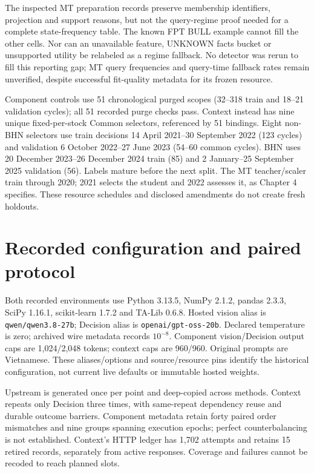 The inspected MT preparation records preserve membership identifiers,
projection and support reasons, but not the query-regime proof needed
for a complete state-frequency table. The known FPT BULL example cannot
fill the other cells. Nor can an unavailable feature, UNKNOWN facts
bucket or unsupported utility be relabeled as a regime fallback.
No detector was rerun to fill this reporting gap; MT query frequencies
and query-time fallback rates remain unverified, despite successful
fit-quality metadata for its frozen resource.

Component controls use 51 chronological purged scopes (32--318 train and
18--21 validation cycles); all 51 recorded purge checks pass. Context
instead has nine unique fixed-per-stock Common selectors, referenced by
51 bindings. Eight non-BHN selectors use train decisions 14 April
2021--30 September 2022 (123 cycles) and validation 6 October 2022--27 June
2023 (54--60 common cycles). BHN uses 20 December 2023--26 December 2024
train (85) and 2 January--25 September 2025 validation (56). Labels mature
before the next split. The MT teacher/scaler train through 2020; 2021
selects the student and 2022 assesses it, as Chapter 4 specifies. These
resource schedules and disclosed amendments do not create fresh holdouts.

\section{Recorded configuration and paired protocol}\label{s:21f290190e1fcedc}
Both recorded environments use Python 3.13.5, NumPy 2.1.2, pandas 2.3.3,
SciPy 1.16.1, scikit-learn 1.7.2 and TA-Lib 0.6.8. Hosted vision alias is
\texttt{qwen/qwen3.8-27b}; Decision alias is \texttt{openai/gpt-oss-20b}.
Declared temperature is zero; archived wire metadata records $10^{-8}$.
Component vision/Decision output caps are 1,024/2,048 tokens; context caps
are 960/960. Original prompts are Vietnamese. These aliases/options and
source/resource pins identify the historical configuration, not current
live defaults or immutable hosted weights.

Upstream is generated once per point and deep-copied across methods.
Context repeats only Decision three times, with same-repeat dependency
reuse and durable outcome barriers. Component metadata retain forty
paired order mismatches and nine groups spanning execution epochs;
perfect counterbalancing is not established. Context's HTTP ledger has
1,702 attempts and retains 15 retired records, separately from active
responses. Coverage and failures cannot be recoded to reach planned slots.

